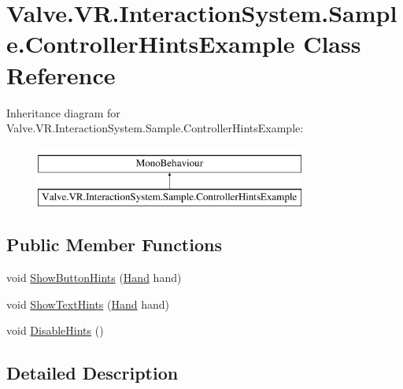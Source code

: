 \hypertarget{class_valve_1_1_v_r_1_1_interaction_system_1_1_sample_1_1_controller_hints_example}{}\section{Valve.\+V\+R.\+Interaction\+System.\+Sample.\+Controller\+Hints\+Example Class Reference}
\label{class_valve_1_1_v_r_1_1_interaction_system_1_1_sample_1_1_controller_hints_example}
Inheritance diagram for Valve.\+V\+R.\+Interaction\+System.\+Sample.\+Controller\+Hints\+Example\+:\begin{figure}[H]
\begin{center}
\leavevmode
\includegraphics[height=2.000000cm]{class_valve_1_1_v_r_1_1_interaction_system_1_1_sample_1_1_controller_hints_example}
\end{center}
\end{figure}
\subsection*{Public Member Functions}
\begin{DoxyCompactItemize}
\item 
void \mbox{\hyperlink{class_valve_1_1_v_r_1_1_interaction_system_1_1_sample_1_1_controller_hints_example_a244df4a9542671bf6c5665434b9f5c60}{Show\+Button\+Hints}} (\mbox{\hyperlink{class_valve_1_1_v_r_1_1_interaction_system_1_1_hand}{Hand}} hand)
\item 
void \mbox{\hyperlink{class_valve_1_1_v_r_1_1_interaction_system_1_1_sample_1_1_controller_hints_example_a2b02bec630167345bb790f2c0c68d477}{Show\+Text\+Hints}} (\mbox{\hyperlink{class_valve_1_1_v_r_1_1_interaction_system_1_1_hand}{Hand}} hand)
\item 
void \mbox{\hyperlink{class_valve_1_1_v_r_1_1_interaction_system_1_1_sample_1_1_controller_hints_example_aea684a278e08648d9462c4a6e44d5111}{Disable\+Hints}} ()
\end{DoxyCompactItemize}


\subsection{Detailed Description}


